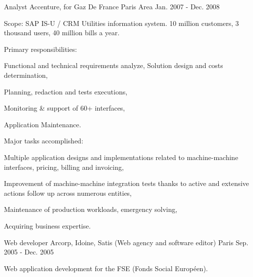 \begin{cventries}
  \cventry
    {Analyst} %
    {Accenture, for Gaz De France} %
    {Paris Area} %
    {Jan. 2007 - Dec. 2008} %
    {
      \begin{cvitems} %
        \item {Scope: SAP IS-U / CRM Utilities information system. 10 million customers, 3 thousand users, 40 million bills a year.}
        \item {Primary responsibilities:}
        \begin{cvsubitems}
          \item {Functional and technical requirements analyze, Solution design and costs determination,}
          \item {Planning, redaction and tests executions,}
          \item {Monitoring \& support of 60+ interfaces,}
          \item {Application Maintenance.}
        \end{cvsubitems}
        \item {Major tasks accomplished:}
        \begin{cvsubitems}
          \item {Multiple application designs and implementations related to machine-machine interfaces, pricing, billing and invoicing,}
          \item {Improvement of machine-machine integration tests thanks to active and extensive actions follow up across numerous entities,}
          \item {Maintenance of production workloads, emergency solving,}
          \item {Acquiring business expertise.}
        \end{cvsubitems}
      \end{cvitems}
    }

  \cventry
    {Web developer} %
    {Arcorp, Idoine, Satis (Web agency and software editor)} %
    {Paris} %
    {Sep. 2005 - Dec. 2005} %
    {
      \begin{cvitems} %
        \item {Web application development for the FSE (Fonds Social Européen).}
      \end{cvitems}
    }

\end{cventries}
